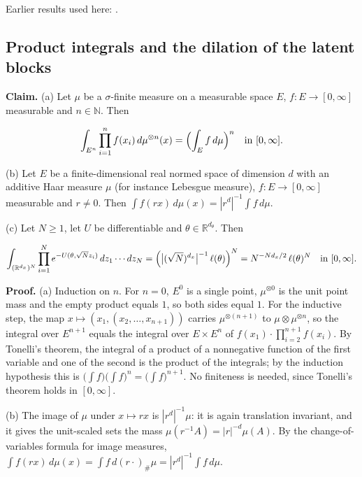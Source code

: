 \documentclass[11pt,a4paper]{report}
\begin{document}
Earlier results used here: \cite[Section~3.26.4]{LangevinLean2026ULASC}.
\subsection{\texorpdfstring{Product integrals and the dilation of the latent blocks}{Product integrals and the dilation of the latent blocks}}
\label{report-step-IPLA-MarginalConcentration-lean-5}


\textbf{Claim.} (a) Let \(\mu\) be a \(\sigma\)-finite measure on a measurable space \(E\), \(f:E\to[0,\infty]\) measurable and \(n\in\mathbb N\). Then


\[\int_{E^n}\prod_{i=1}^nf(x_i)\,d\mu^{\otimes n}(x)=\Bigl(\int_Ef\,d\mu\Bigr)^n\quad\text{in }[0,\infty].\]


(b) Let \(E\) be a finite-dimensional real normed space of dimension \(d\) with an additive Haar measure \(\mu\) (for instance Lebesgue measure), \(f:E\to[0,\infty]\) measurable and \(r\ne0\). Then \(\int f(rx)\,d\mu(x)=|r^d|^{-1}\int f\,d\mu\).




(c) Let \(N\ge1\), let \(U\) be differentiable and \(\theta\in\mathbb R^{d_\theta}\). Then


\[\int_{(\mathbb R^{d_x})^N}\prod_{i=1}^Ne^{-U(\theta,\sqrt Nz_i)}\,dz_1\cdots dz_N=\Bigl(\bigl|(\sqrt N)^{d_x}\bigr|^{-1}\,\ell(\theta)\Bigr)^N=N^{-Nd_x/2}\,\ell(\theta)^N\quad\text{in }[0,\infty].\]


\textbf{Proof.} (a) Induction on \(n\). For \(n=0\), \(E^0\) is a single point, \(\mu^{\otimes0}\) is the unit point mass and the empty product equals \(1\), so both sides equal \(1\). For the inductive step, the map \(x\mapsto(x_1,(x_2,\dots,x_{n+1}))\) carries \(\mu^{\otimes(n+1)}\) to \(\mu\otimes\mu^{\otimes n}\), so the integral over \(E^{n+1}\) equals the integral over \(E\times E^n\) of \(f(x_1)\cdot\prod_{i=2}^{n+1}f(x_i)\). By Tonelli's theorem, the integral of a product of a nonnegative function of the first variable and one of the second is the product of the integrals; by the induction hypothesis this is \(\bigl(\int f\bigr)\bigl(\int f\bigr)^n=\bigl(\int f\bigr)^{n+1}\). No finiteness is needed, since Tonelli's theorem holds in \([0,\infty]\).




(b) The image of \(\mu\) under \(x\mapsto rx\) is \(|r^d|^{-1}\mu\): it is again translation invariant, and it gives the unit-scaled sets the mass \(\mu(r^{-1}A)=|r|^{-d}\mu(A)\). By the change-of-variables formula for image measures, \(\int f(rx)\,d\mu(x)=\int f\,d(r\cdot)_\#\mu=|r^d|^{-1}\int f\,d\mu\).
\end{document}
